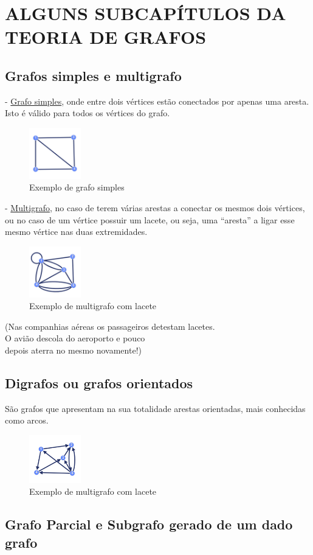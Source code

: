 \section{ALGUNS SUBCAPÍTULOS DA TEORIA DE GRAFOS}
\subsection{Grafos simples e multigrafo}
- \underline{Grafo simples}, onde entre dois vértices estão conectados por apenas uma aresta. Isto é válido para
todos os vértices do grafo.
\begin{figure}[h]
    \centering
    \includegraphics[width=0.2\textwidth]{imgs/Figura3}
    \caption{Exemplo de grafo simples\label{fig:imagem3}}
\end{figure}
\linebreak
- \underline{Multigrafo}, no caso de terem várias arestas a conectar os mesmos dois vértices, ou no caso de um vértice possuir um lacete, ou seja, uma “aresta” a ligar esse mesmo vértice nas duas extremidades.
\begin{figure}[h]
    \centering
    \includegraphics[width=0.2\textwidth]{imgs/Figura4}
    \caption{Exemplo de multigrafo com lacete\label{fig:imagem4}}
\end{figure}
\linebreak
\flushright\scriptsize{(Nas companhias aéreas os passageiros detestam lacetes.\\O avião descola do aeroporto e pouco\\depois aterra no mesmo novamente!)}
\subsection{Digrafos ou grafos orientados}
São grafos que apresentam na sua totalidade arestas orientadas, mais conhecidas como arcos.
\linebreak
\begin{figure}[h]
    \centering
    \includegraphics[width=0.2\textwidth]{imgs/Figura5}
    \caption{Exemplo de multigrafo com lacete\label{fig:imagem5}}
\end{figure}

\subsection{Grafo Parcial e Subgrafo gerado de um dado grafo}
